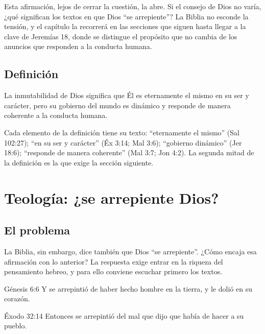 Esta afirmación, lejos de cerrar la cuestión, la abre. Si el consejo de Dios no varía, ¿qué significan los textos en que Dios ``se arrepiente''? La Biblia no esconde la tensión, y el capítulo la recorrerá en las secciones que siguen hasta llegar a la clave de Jeremías 18, donde se distingue el propósito que no cambia de los anuncios que responden a la conducta humana.

\subsection{Definición}
\begin{tcolorbox}[colback=papiro,colframe=azul,boxrule=1pt,arc=3pt,title={Definición teológica bíblica},colbacktitle=azul,coltitle=papiro]
La inmutabilidad de Dios significa que Él es eternamente el mismo en su ser y carácter, pero su gobierno del mundo es dinámico y responde de manera coherente a la conducta humana.
\end{tcolorbox}

Cada elemento de la definición tiene su texto: ``eternamente el mismo'' (Sal 102:27); ``en su ser y carácter'' (Éx 3:14; Mal 3:6); ``gobierno dinámico'' (Jer 18:6); ``responde de manera coherente'' (Mal 3:7; Jon 4:2). La segunda mitad de la definición es la que exige la sección siguiente.

\section{Teología: ¿se arrepiente Dios?}

\subsection{El problema}
La Biblia, sin embargo, dice también que Dios ``se arrepiente''. ¿Cómo encaja esa afirmación con lo anterior? La respuesta exige entrar en la riqueza del pensamiento hebreo, y para ello conviene escuchar primero los textos.

\begin{verso}{Génesis 6:6}
Y se arrepintió \SENOR{} de haber hecho hombre en la tierra, y le dolió en su corazón.
\end{verso}

\begin{verso}{Éxodo 32:14}
Entonces \SENOR{} se arrepintió del mal que dijo que había de hacer a su pueblo.
\end{verso}

